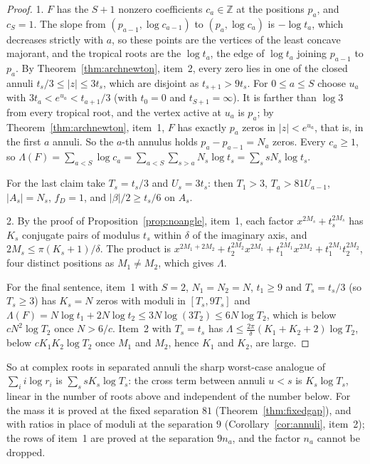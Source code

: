 \documentclass[11pt]{article}
\begin{document}
\begin{proof}
1.  $F$ has the $S+1$ nonzero coefficients $c_a\in\mathbb Z$ at the positions
$p_a$, and $c_S=1$.  The slope from $(p_{a-1},\log c_{a-1})$ to
$(p_a,\log c_a)$ is $-\log t_a$, which decreases strictly with $a$, so these
points are the vertices of the least concave majorant, and the tropical roots
are the $\log t_a$, the edge of $\log t_a$ joining $p_{a-1}$ to $p_a$.  By
Theorem~\ref{thm:archnewton}, item~2, every zero lies in one of the closed
annuli $t_s/3\le|z|\le3t_s$, which are disjoint as $t_{s+1}>9t_s$.  For $0\le a\le S$
choose $u_a$ with $3t_a<e^{u_a}<t_{a+1}/3$ (with $t_0=0$ and $t_{S+1}=\infty$).
It is farther than $\log3$ from every tropical root, and the vertex active at
$u_a$ is $p_a$; by Theorem~\ref{thm:archnewton}, item~1, $F$ has exactly
$p_a$ zeros in $|z|<e^{u_a}$, that is, in the first $a$ annuli.  So the
$a$-th annulus holds $p_a-p_{a-1}=N_a$ zeros.  Every $c_a\ge1$, so
$\Lambda(F)=\sum_{a<S}\log c_a=\sum_{a<S}\sum_{s>a}N_s\log t_s
=\sum_ssN_s\log t_s$.

For the last claim take $T_s=t_s/3$ and $U_s=3t_s$: then $T_1>3$,
$T_a>81U_{a-1}$, $|A_s|=N_s$, $f_D=1$, and $|\beta|/2\ge t_s/6$ on $A_s$.

2.  By the proof of Proposition~\ref{prop:noangle}, item~1, each factor
$x^{2M_s}+t_s^{2M_s}$ has $K_s$ conjugate pairs of modulus $t_s$ within
$\delta$ of the imaginary axis, and $2M_s\le\pi(K_s+1)/\delta$.  The product
is $x^{2M_1+2M_2}+t_2^{2M_2}x^{2M_1}+t_1^{2M_1}x^{2M_2}+t_1^{2M_1}t_2^{2M_2}$,
four distinct positions as $M_1\ne M_2$, which gives $\Lambda$.

For the final sentence, item~1 with $S=2$, $N_1=N_2=N$, $t_1\ge9$ and $T_s=t_s/3$ (so $T_s\ge3$)
has $K_s=N$ zeros with moduli in $[T_s,9T_s]$ and
$\Lambda(F)=N\log t_1+2N\log t_2\le3N\log(3T_2)\le6N\log T_2$, which is below
$cN^2\log T_2$ once $N>6/c$.  Item~2 with $T_s=t_s$ has
$\Lambda\le\frac{2\pi}\delta(K_1+K_2+2)\log T_2$, below $cK_1K_2\log T_2$
once $M_1$ and $M_2$, hence $K_1$ and $K_2$, are large.
\end{proof}

So at complex roots in separated annuli the sharp worst-case analogue of
$\sum_ii\log r_i$ is $\sum_ssK_s\log T_s$: the cross term between annuli $u<s$ is $K_s\log T_s$,
linear in the number of roots above and independent of the number below.  For
the mass it is proved at the fixed separation $81$
(Theorem~\ref{thm:fixedgap}), and with ratios in place of moduli at the
separation $9$ (Corollary~\ref{cor:annuli}, item~2); the rows of item~1 are
proved at the separation $9n_a$, and the factor $n_a$ cannot be dropped.
\end{document}
